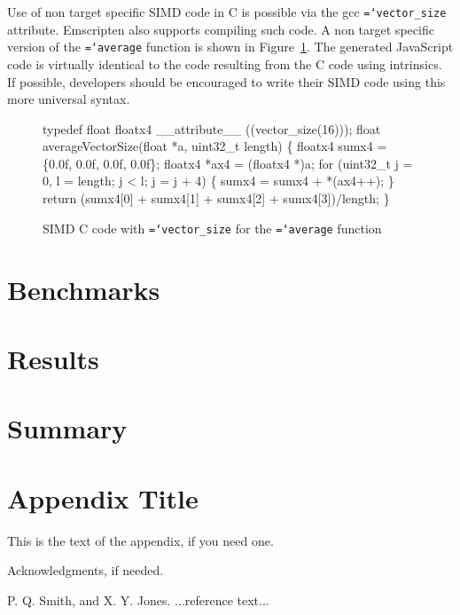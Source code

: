 \documentclass[preprint]{sigplanconf}
\newcommand{\ttt}[1]{{\texttt{\hyphenchar\font=`\-\relax #1}}}%
\begin{document}
Use of non target specific SIMD code in C is possible via the gcc
\ttt{vector\_size} attribute.  Emscripten also supports compiling such code.  A
non target specific version of the \ttt{average} function is shown in
Figure~\ref{fig:average-vector}.  The generated JavaScript code is virtually
identical to the code resulting from the C code using intrinsics. If
possible, developers should be encouraged to write their SIMD code using
this more universal syntax.

\begin{figure}
\begin{small}
\begin{program}[style=tt, number=true]
typedef float floatx4 \_\_attribute\_\_ ((vector\_size(16)));
fl\tab{}oat averageVectorSize(float *a, uint32\_t length) \{
  floatx4 sumx4 = \{0.0f, 0.0f, 0.0f, 0.0f\};
  floatx4 *ax4  = (floatx4 *)a;
  fo\tab{}r (uint32\_t j = 0, l = length; j < l; j = j + 4) \{
    sumx4 = sumx4 + *(ax4++);\untab{}
  \}
  return (\tab{}sumx4[0] + sumx4[1] +
          sumx4[2] + sumx4[3])/length;\untab{}\untab{}
\}
\end{program}
\end{small}
\caption{SIMD C code with \ttt{vector\_size} for the \ttt{average} function}
\label{fig:average-vector}
\end{figure}


\section{Benchmarks}

\section{Results}

\section{Summary}

\appendix
\section{Appendix Title}

This is the text of the appendix, if you need one.

\acks

Acknowledgments, if needed.





\begin{thebibliography}{}
\softraggedright

P. Q. Smith, and X. Y. Jones. ...reference text...

\end{thebibliography}
\end{document}
